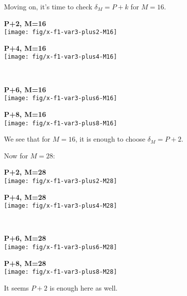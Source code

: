 \documentclass[a4paper,10pt]{article}
\begin{document}
Moving on, it's time to check $\delta_M = P+k$ for $M=16$.\\[\baselineskip]
\begin{minipage}{0.5\textwidth}\centering
  \textbf{P+2, M=16}\\
  \texttt{[image: fig/x-f1-var3-plus2-M16]}
\end{minipage}%
\begin{minipage}{0.5\textwidth}\centering
  \textbf{P+4, M=16}\\
  \texttt{[image: fig/x-f1-var3-plus4-M16]}
\end{minipage}\\
\begin{minipage}{0.5\textwidth}\centering
  \textbf{P+6, M=16}\\
  \texttt{[image: fig/x-f1-var3-plus6-M16]}
\end{minipage}%
\begin{minipage}{0.5\textwidth}\centering
  \textbf{P+8, M=16}\\
  \texttt{[image: fig/x-f1-var3-plus8-M16]}
\end{minipage}
We see that for $M=16$, it is enough to choose $\delta_M=P+2$.

Now for $M=28$:\\[\baselineskip]
\begin{minipage}{0.5\textwidth}\centering
  \textbf{P+2, M=28}\\
  \texttt{[image: fig/x-f1-var3-plus2-M28]}
\end{minipage}%
\begin{minipage}{0.5\textwidth}\centering
  \textbf{P+4, M=28}\\
  \texttt{[image: fig/x-f1-var3-plus4-M28]}
\end{minipage}\\
\begin{minipage}{0.5\textwidth}\centering
  \textbf{P+6, M=28}\\
  \texttt{[image: fig/x-f1-var3-plus6-M28]}
\end{minipage}%
\begin{minipage}{0.5\textwidth}\centering
  \textbf{P+8, M=28}\\
  \texttt{[image: fig/x-f1-var3-plus8-M28]}
\end{minipage}
It seems $P+2$ is enough here as well.
\end{document}
